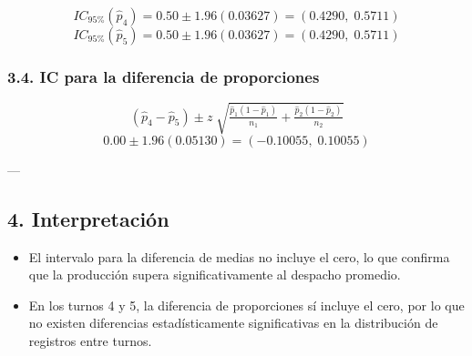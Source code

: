 \[
IC_{95\%}(\hat p_4) = 0.50 \pm 1.96(0.03627) = (0.4290,\;0.5711)
\]
\[
IC_{95\%}(\hat p_5) = 0.50 \pm 1.96(0.03627) = (0.4290,\;0.5711)
\]

\subsubsection*{3.4. IC para la diferencia de proporciones}
\[
(\hat p_4-\hat p_5) \pm z\;\sqrt{\tfrac{\hat p_1(1-\hat p_1)}{n_1}+\tfrac{\hat p_2(1-\hat p_2)}{n_2}}
\]
\[
0.00 \pm 1.96(0.05130) = (-0.10055,\;0.10055)
\]

---

\subsection*{4. Interpretación}
\begin{itemize}
    \item El intervalo para la diferencia de medias no incluye el cero, lo que confirma que la producción supera significativamente al despacho promedio.
    \item En los turnos 4 y 5, la diferencia de proporciones sí incluye el cero, por lo que no existen diferencias estadísticamente significativas en la distribución de registros entre turnos.
\end{itemize}
